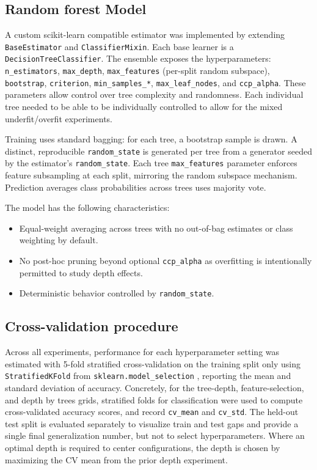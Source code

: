 \documentclass[conference]{IEEEtran}
\begin{document}
\subsection{Random forest Model}

A custom scikit-learn compatible estimator was implemented by extending \texttt{BaseEstimator} and \texttt{ClassifierMixin}. Each base learner is a \texttt{DecisionTreeClassifier}. The 
ensemble exposes the hyperparameters: \texttt{n\_estimators}, \texttt{max\_depth}, \texttt{max\_features} (per-split random subspace), \texttt{bootstrap}, \texttt{criterion}, 
\texttt{min\_samples\_*}, \texttt{max\_leaf\_nodes}, and \texttt{ccp\_alpha}. These parameters allow control over tree complexity and randomness. Each individual tree needed 
to be able to be individually controlled to allow for the mixed underfit/overfit experiments.

Training uses standard bagging: for each tree, a bootstrap sample is drawn. A distinct, reproducible \texttt{random\_state} is generated per tree from a generator seeded by the estimator's
 \texttt{random\_state}. Each tree \texttt{max\_features} parameter enforces feature subsampling at each split, mirroring the random subspace mechanism. Prediction averages class probabilities across trees uses majority vote.

The model has the following characteristics:
\begin{itemize}
  \item Equal-weight averaging across trees with no out-of-bag estimates or class weighting by default.
  \item No post-hoc pruning beyond optional \texttt{ccp\_alpha} as overfitting is intentionally permitted to study depth effects.
  \item Deterministic behavior controlled by \texttt{random\_state}.
\end{itemize}


\subsection{Cross-validation procedure}
Across all experiments, performance for each hyperparameter setting was estimated with 5-fold stratified cross-validation on the training split only using \texttt{StratifiedKFold} from \texttt{sklearn.model\_selection} \cite{scikit-learn}, 
reporting the mean and standard deviation of accuracy. Concretely, for the tree-depth, feature-selection, and depth by trees grids, stratified folds for classification
were used to compute cross-validated accuracy scores, and record \texttt{cv\_mean} and \texttt{cv\_std}. The held-out test split is evaluated separately to
visualize train and test gaps and provide a single final generalization number, but not to select hyperparameters. Where an optimal depth is required to center 
 configurations, the depth is chosen by maximizing the CV mean from the prior depth experiment.
\end{document}
